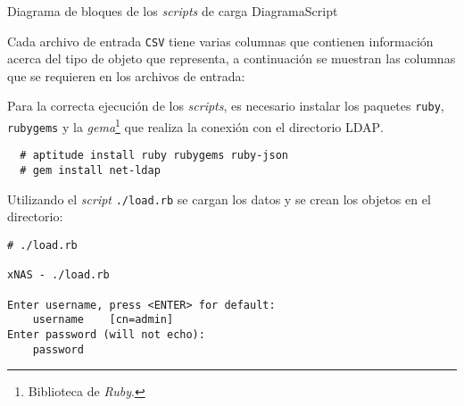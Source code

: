 \diagramblock
{Diagrama de bloques de los \textit{scripts} de carga}
{DiagramaScript}
{
 {
  
 }
}

Cada archivo de entrada \texttt{CSV} tiene varias columnas que contienen informaci\'{o}n acerca del tipo de objeto que representa, a continuaci\'{o}n se muestran las columnas que se requieren en los archivos de entrada:

{
 \begin{table}[H]
 \caption{Formato de los archivos \textsc{CSV} para la carga de datos}{}
 \label{tab:csv-format}
 \noindent{} %
 \end{table}
}

Para la correcta ejecuci\'{o}n de los \textit{scripts}, es necesario instalar los paquetes \texttt{ruby}, \texttt{rubygems} y la \textit{gema}\footnote{Biblioteca de \textsl{Ruby}.} que realiza la conexi\'{o}n con el directorio \textsc{LDAP}.

{
\scriptsize
\linespread{1}
\begin{verbatim}
  # aptitude install ruby rubygems ruby-json
  # gem install net-ldap
\end{verbatim}
}

Utilizando el \textit{script} \texttt{./load.rb} se cargan los datos y se crean los objetos en el directorio:

{
\scriptsize
\linespread{1}
\begin{verbatim}
# ./load.rb

xNAS - ./load.rb

Enter username, press <ENTER> for default:
    username    [cn=admin]
Enter password (will not echo):
    password
\end{verbatim}
}

